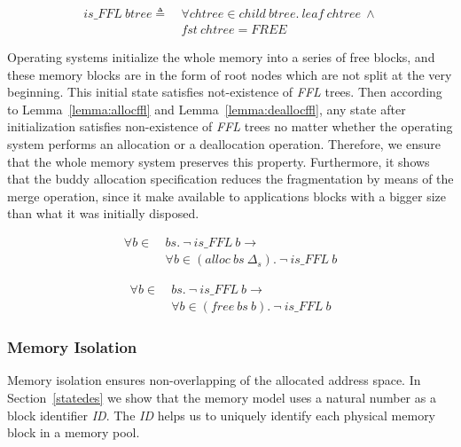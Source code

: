 \begin{definition} 
\label{def:FF4}
\end{definition}
\vspace{-7pt}
\begin{align*}
is\_FFL\ btree \triangleq\ &\forall chtree \in child\ btree.\ leaf\ chtree\ \wedge \\
&fst\ chtree = FREE
\end{align*}
\vspace{-12pt}

Operating systems initialize the whole memory into a series of free blocks, and these memory blocks are in the form of root nodes which are not split at the very beginning. This initial state satisfies not-existence of \emph{FFL} trees. Then according to Lemma~\ref{lemma:allocffl} and Lemma~\ref{lemma:deallocffl}, any state after initialization satisfies non-existence of \emph{FFL} trees no matter whether the operating system performs an allocation or a deallocation operation. Therefore, we ensure that the whole memory system preserves this property. Furthermore, it shows that the buddy allocation specification reduces the fragmentation by means of the merge operation, since it make available to applications blocks with a bigger size than what it was initially disposed.

\begin{lemma} 
\label{lemma:allocffl}
\begin{align*}
\forall b \in\ &bs.\ \neg\ is\_FFL\ b \longrightarrow \\
&\forall b \in (alloc\ bs\ \Delta_s).\ \neg\ is\_FFL\ b
\end{align*}
\end{lemma}

\begin{lemma} 
\label{lemma:deallocffl}
\begin{align*}
\forall b \in\ &bs.\ \neg\ is\_FFL\ b \longrightarrow \\
&\forall b \in (free\ bs\ b).\ \neg\ is\_FFL\ b
\end{align*}
\end{lemma}

\subsubsection{Memory Isolation}
Memory isolation ensures non-overlapping of the allocated address space. In Section~\ref{statedes} we show that the memory model uses a natural number as a block identifier \emph{ID}. The \emph{ID} helps us to uniquely identify each physical memory block in a memory pool.

